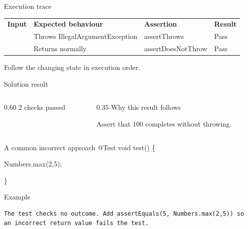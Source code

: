\documentclass[10pt,aspectratio=169]{beamer}
\begin{document}
\begin{frame}[fragile,t]{Execution trace}
\small\renewcommand{\arraystretch}{1.5}
\begin{tabularx}{\textwidth}{>{\raggedright\arraybackslash}X>{\raggedright\arraybackslash}X>{\raggedright\arraybackslash}X>{\raggedright\arraybackslash}X}
\rowcolor{navy}
\color{white}\bfseries Input & \color{white}\bfseries Expected behaviour & \color{white}\bfseries Assertion & \color{white}\bfseries Result\\
101 & Throws IllegalArgumentException & assertThrows & Pass\\
100 & Returns normally & assertDoesNotThrow & Pass\\
\end{tabularx}
\vspace{3mm}\footnotesize Follow the changing state in execution order.
\end{frame}

\begin{frame}[fragile,t]{Solution result}
\begin{columns}[T,onlytextwidth]\begin{column}{0.60\textwidth}
2 checks passed
\end{column}\begin{column}{0.35\textwidth}\small
Why this result follows

Assert that 100 completes without throwing.
\end{column}\end{columns}
\end{frame}

\begin{frame}[fragile,t]{A common incorrect approach}
@Test void test() \{\par   Numbers.max(2,5);\par \}
\vspace{1mm}\begin{block}{Example}
\begin{lstlisting}
The test checks no outcome. Add assertEquals(5, Numbers.max(2,5)) so an incorrect return value fails the test.
\end{lstlisting}
\end{block}
\end{frame}
\end{document}
